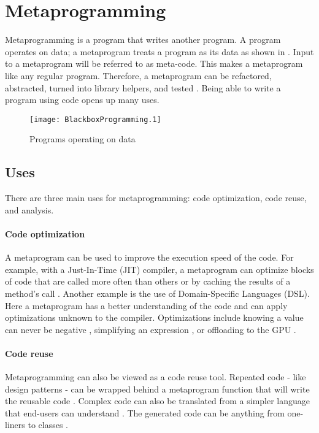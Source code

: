 \section{Metaprogramming}
\label{sec:metaprogramming}
Metaprogramming is a program that writes another program.
A program operates on data; a metaprogram treats a program as its data as shown in  \cite{savidis_19_01, anggoro_17_01, sheard_01_01}.
Input to a metaprogram will be referred to as meta-code.
This makes a metaprogram like any regular program.
Therefore, a metaprogram can be refactored, abstracted, turned into library helpers, and tested \cite{lilis_15_01}.
Being able to write a program using code opens up many uses.

\begin{figure}[h]
	\centering
	\texttt{[image: BlackboxProgramming.1]}
	\caption{Programs operating on data}
	\label{fig:BlackboxProgramming}
\end{figure}


\subsection{Uses}
There are three main uses for metaprogramming: code optimization, code reuse, and analysis.

\paragraph{Code optimization}
A metaprogram can be used to improve the execution speed of the code.
For example, with a Just-In-Time (JIT) compiler, a metaprogram can optimize blocks of code that are called more often than others \cite{hinsen_13_01} or by caching the results of a method's call \cite{seaton_15_01}.
Another example is the use of Domain-Specific Languages (DSL). 
Here a metaprogram has a better understanding of the code and can apply optimizations unknown to the compiler.
Optimizations include knowing a value can never be negative \cite{hinsen_13_01}, simplifying an expression \cite{sheard_01_01}, or offloading to the GPU \cite{videau_18_01}.

\paragraph{Code reuse}
Metaprogramming can also be viewed as a code reuse tool.
Repeated code - like design patterns \cite{lilis_15_01, alexandrescu_01_01} - can be wrapped behind a metaprogram function that will write the reusable code \cite{savidis_19_01, klabnik_2019_01}.
Complex code can also be translated from a simpler language that end-users can understand \cite{hinsen_13_01}.
The generated code can be anything from one-liners to classes \cite{savidis_19_01}.

